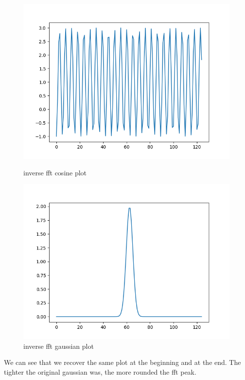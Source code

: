 \documentclass[a4paper,11pt,english]{article}
\begin{document}
\begin{enumerate}
\begin{enumerate}
		\begin{figure}[H]
			\includegraphics[width=\linewidth]{cgp/cosines_inverse_fft}
			\caption{inverse fft cosine plot}
			\endminipage \hfill
			\includegraphics[width=\linewidth]{cgp/gauss_inverse_fft}
			\caption{inverse fft gaussian plot}
			\endminipage \hfill
		\end{figure}
		
		\par We can see that we recover the same plot at the beginning and at the end. The tighter the original gaussian was, the more rounded the fft peak. 
		

\end{enumerate}
\end{enumerate}
\end{document}
